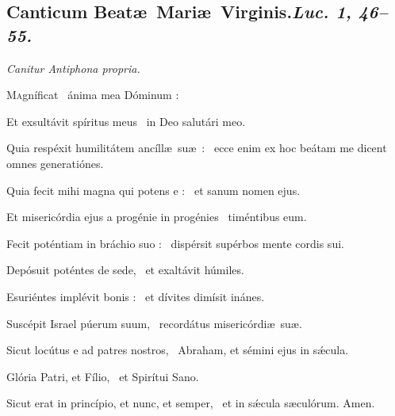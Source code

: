 \documentclass[12pt]{article} %
\newenvironment{psalmtext}{\leftskip 0.25in}{\vspace{2 mm}}
\newenvironment{rubric}{\vspace{2 mm}\color{benred8} \itshape \leftskip 0in \setlength{\parindent}{0.25in}}{\vspace{2 mm}}
\let\oldgresixstar\gresixstar
\renewcommand{\gresixstar}{\textcolor{benred8}{\oldgresixstar}}
\let\oldgrealtcross\grealtcross
\renewcommand{\grealtcross}{\textcolor{benred8}{\oldgrealtcross}}
\def\capitulumSpace{\hspace{20 mm}}
\begin{document}
\begin{pages}
\begin{Leftside}

\subsection*{Canticum Beat\ae\ Mari\ae\ Virginis.\capitulumSpace \emph{Luc. 1, 46--55.}}

\pend\pstart

\begin{rubric}
Canitur Antiphona propria.

\end{rubric}

\pend\pstart

\begin{psalmtext}
\lettrine[lhang=0.70]{M}{a}gn\'{i}ficat \grealtcross\ \'{a}nima mea D\'{o}minum :

\hspace*{9.5 mm}Et exsult\'{a}vit sp\'{i}ritus meus \gresixstar\ in Deo salut\'{a}ri meo.

Quia resp\'{e}xit humilit\'{a}tem anc\'{i}ll\ae\ su\ae\ : \gresixstar\ ecce enim ex hoc be\'{a}tam me dicent omnes generati\'{o}nes.

Quia fecit mihi magna qui potens e : \gresixstar\ et sanum nomen ejus.

Et miseric\'{o}rdia ejus a prog\'{e}nie in prog\'{e}nies \gresixstar\ tim\'{e}ntibus eum.

Fecit pot\'{e}ntiam in br\'{a}chio suo : \gresixstar\ disp\'{e}rsit sup\'{e}rbos mente cordis sui.

Dep\'{o}suit pot\'{e}ntes de sede, \gresixstar\ et exalt\'{a}vit h\'{u}miles.

Esuri\'{e}ntes impl\'{e}vit bonis : \gresixstar\ et d\'{i}vites dim\'{i}sit in\'{a}nes.

Susc\'{e}pit Israel p\'{u}erum suum, \gresixstar\ record\'{a}tus miseric\'{o}rdi\ae\ su\ae.

Sicut loc\'{u}tus e ad patres nostros, \gresixstar\ Abraham, et s\'{e}mini ejus in s\'{\ae}cula.

Glória Patri, et Fílio, \gresixstar\ et Spirítui Sano.

Sicut erat in princípio, et nunc, et semper, \gresixstar\ et in sǽcula sæculórum. Amen.

\end{psalmtext}

\pend\pstart


\end{Leftside}
\end{pages}
\end{document}
